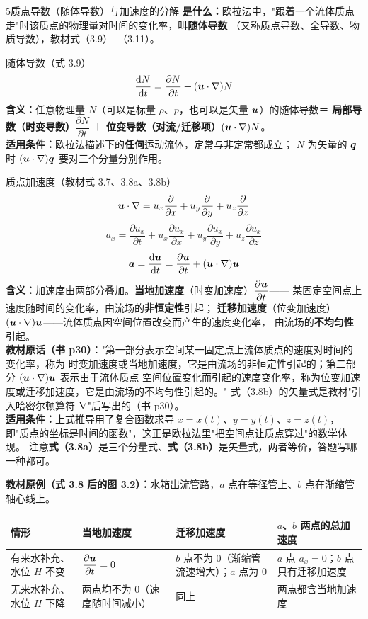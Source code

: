\begin{kaodian}{5}{质点导数（随体导数）与加速度的分解}
\textbf{是什么：}欧拉法中，"跟着一个流体质点走"时该质点的物理量对时间的变化率，叫\textbf{随体导数}
（又称质点导数、全导数、物质导数），教材式（3.9）--（3.11）。

\begin{gongshi}{随体导数（式 3.9）}
\[ \frac{\mathrm{d} N}{\mathrm{d} t}=\frac{\partial N}{\partial t}+(\bm{u}\cdot\nabla)N \]
\textbf{含义：}任意物理量 $N$（可以是标量 $\rho$、$p$，也可以是矢量 $\bm{u}$）的随体导数＝
\textbf{局部导数（时变导数）}$\dfrac{\partial N}{\partial t}$ ＋ \textbf{位变导数（对流/迁移项）}$(\bm{u}\cdot\nabla)N$。\\
\textbf{适用条件：}欧拉法描述下的\textbf{任何}运动流体，定常与非定常都成立；
$N$ 为矢量的 $\bm{q}$ 时 $(\bm{u}\cdot\nabla)\bm{q}$ 要对三个分量分别作用。
\end{gongshi}

\begin{gongshi}{质点加速度（教材式 3.7、3.8a、3.8b）}
\[ \bm{u}\cdot\nabla=u_x\frac{\partial}{\partial x}+u_y\frac{\partial}{\partial y}+u_z\frac{\partial}{\partial z} \]
\[ a_x=\frac{\partial u_x}{\partial t}+u_x\frac{\partial u_x}{\partial x}+u_y\frac{\partial u_x}{\partial y}+u_z\frac{\partial u_x}{\partial z} \]
\[ \bm{a}=\frac{\mathrm{d}\bm{u}}{\mathrm{d} t}=\frac{\partial\bm{u}}{\partial t}+(\bm{u}\cdot\nabla)\bm{u} \]
\textbf{含义：}加速度由两部分叠加。\textbf{当地加速度}（时变加速度）$\dfrac{\partial\bm{u}}{\partial t}$——
某固定空间点上速度随时间的变化率，由流场的\textbf{非恒定性}引起；
\textbf{迁移加速度}（位变加速度）$(\bm{u}\cdot\nabla)\bm{u}$——流体质点因空间位置改变而产生的速度变化率，
由流场的\textbf{不均匀性}引起。\\
\textbf{教材原话（书 p30）}："第一部分表示空间某一固定点上流体质点的速度对时间的变化率，称为
时变加速度或当地加速度，它是由流场的非恒定性引起的；第二部分 $(\bm{u}\cdot\nabla)\bm{u}$ 表示由于流体质点
空间位置变化而引起的速度变化率，称为位变加速度或迁移加速度，它是由流场的不均匀性引起的。"
式（3.8b）的矢量式是教材"引入哈密尔顿算符 $\nabla$"后写出的（书 p30）。\\
\textbf{适用条件：}上式推导用了复合函数求导 $x=x(t)$、$y=y(t)$、$z=z(t)$，
即"质点的坐标是时间的函数"，这正是欧拉法里"把空间点让质点穿过"的数学体现。
注意\textbf{式（3.8a）}是三个分量式、\textbf{式（3.8b）}是矢量式，两者等价，答题写哪一种都可。
\end{gongshi}

\textbf{教材原例（式 3.8 后的图 3.2）：}水箱出流管路，$a$ 点在等径管上、$b$ 点在渐缩管轴心线上。
\begin{center}
\begin{tabularx}{\textwidth}{@{}lXXX@{}}
\toprule
情形 & 当地加速度 & 迁移加速度 & $a$、$b$ 两点的总加速度 \\
\midrule
有来水补充、水位 $H$ 不变 & $\dfrac{\partial\bm{u}}{\partial t}=0$ & $b$ 点不为 0（渐缩管流速增大）；$a$ 点为 0 & $a$ 点 $a_x=0$；$b$ 点只有迁移加速度 \\
无来水补充、水位 $H$ 下降 & 两点均不为 0（速度随时间减小）& 同上 & 两点都含当地加速度 \\
\bottomrule
\end{tabularx}
\end{center}


\end{kaodian}
